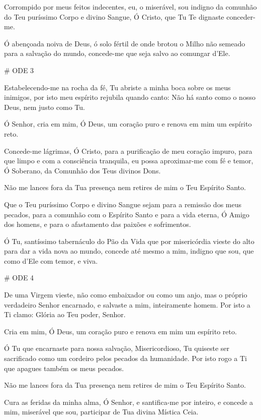 \documentclass{subfiles}
\begin{document}
Corrompido por meus feitos indecentes, eu, o miserável, sou indigno da comunhão
do Teu puríssimo Corpo e divino Sangue, Ó Cristo, que Tu Te dignaste
conceder-me.

\Doxology{}

Ó abençoada noiva de Deus, ó solo fértil de onde brotou o Milho não semeado para
a salvação do mundo, concede-me que seja salvo ao comungar d’Ele.

# ODE 3

\eirmos{}Estabelecendo-me na rocha da fé, Tu abriste a minha boca sobre os meus
inimigos, por isto meu espírito rejubila quando canto: Não há santo como o nosso
Deus, nem justo como Tu.

Ó Senhor, cria em mim, Ó Deus, um coração puro e renova em mim um espírito reto.

Concede-me lágrimas, Ó Cristo, para a purificação de meu coração impuro, para
que limpo e com a consciência tranquila, eu possa aproximar-me com fé e temor, Ó
Soberano, da Comunhão dos Teus divinos Dons.

Não me lances fora da Tua presença nem retires de mim o Teu Espírito Santo.

Que o Teu puríssimo Corpo e divino Sangue sejam para a remissão dos meus
pecados, para a comunhão com o Espírito Santo e para a vida eterna, Ó Amigo dos
homens, e para o afastamento das paixões e sofrimentos.

\Doxology{}

Ó Tu, santíssimo tabernáculo do Pão da Vida que por misericórdia vieste do alto
para dar a vida nova ao mundo, concede até mesmo a mim, indigno que sou, que
como d’Ele com temor, e viva.

# ODE 4

\eirmos{}De uma Virgem vieste, não como embaixador ou como um anjo, mas o próprio
verdadeiro Senhor encarnado, e salvaste a mim, inteiramente homem. Por isto a Ti
clamo: Glória ao Teu poder, Senhor.

Cria em mim, Ó Deus, um coração puro e renova em mim um espírito reto.

Ó Tu que encarnaste para nossa salvação, Misericordioso, Tu quiseste ser
sacrificado como um cordeiro pelos pecados da humanidade. Por isto rogo a Ti que
apagues também os meus pecados.

Não me lances fora da Tua presença nem retires de mim o Teu Espírito Santo.

Cura as feridas da minha alma, Ó Senhor, e santifica-me por inteiro, e concede a
mim, miserável que sou, participar de Tua divina Mística Ceia.
\end{document}
